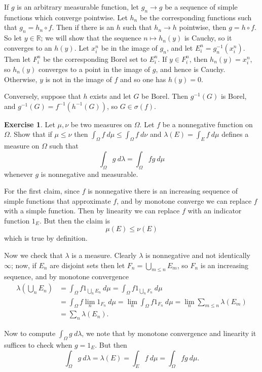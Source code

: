 \documentclass[10pt]{article}
\newcommand{\RR}{\mathbb{R}}
\theoremstyle{definition}
\newtheorem{exer}{Exercise}
\begin{document}
If $g$ is an arbitrary measurable function, let $g_n \to g$ be a sequence of simple functions which converge pointwise.
Let $h_n$ be the corresponding functions such that $g_n = h_n \circ f$. Then if there is an $h$ such that $h_n \to h$ pointwise, then $g = h \circ f$.
So let $y \in \RR$; we will show that the sequence $n \mapsto h_n(y)$ is Cauchy, so it converges to an $h(y)$.
Let $x_i^n$ be in the image of $g_n$, and let $E_i^n = g_n^{-1}(x_i^n)$.
Then let $F_i^n$ be the corresponding Borel set to $E_i^n$.
If $y \in F_i^n$, then $h_n(y) = x_i^n$, so $h_n(y)$ converges to a point in the image of $g$, and hence is Cauchy.
Otherwise, $y$ is not in the image of $f$ and so one has $h(y) = 0$.

Conversely, suppose that $h$ exists and let $G$ be Borel. Then $g^{-1}(G)$ is Borel, and $g^{-1}(G) = f^{-1}(h^{-1}(G))$, so $G \in \sigma(f)$.

\begin{exer}
Let $\mu, \nu$ be two measures on $\Omega$. Let $f$ be a nonnegative function on $\Omega$. Show that if $\mu \leq \nu$ then $\int_\Omega f ~d\mu \leq \int_\Omega f~d\nu$ and $\lambda(E) = \int_E f~d\mu$ defines a measure on $\Omega$ such that
$$\int_\Omega g~d\lambda = \int_\Omega fg~d\mu$$
whenever $g$ is nonnegative and measurable.
\end{exer}

For the first claim, since $f$ is nonnegative there is an increasing sequence of simple functions that approximate $f$, and by monotone converge we can replace $f$ with a simple function.
Then by linearity we can replace $f$ with an indicator function $1_E$. But then the claim is
$$\mu(E) \leq \nu(E)$$
which is true by definition.

Now we check that $\lambda$ is a measure. Clearly $\lambda$ is nonnegative and not identically $\infty$; now, if $E_n$ are disjoint sets then let $F_n = \bigcup_{m \leq n} E_m$, so $F_n$ is an increasing sequence, and by monotone convergence
\begin{align*}
\lambda\left(\bigcup_n E_n\right) &= \int_\Omega f1_{\bigcup_n E_n}~d\mu = \int_\Omega f1_{\bigcup_n F_n} ~d\mu \\
&= \int_\Omega f\lim_n 1_{F_n}~d\mu = \lim_n \int_\Omega f1_{F_n}~d\mu = \lim_n \sum_{m \leq n} \lambda(E_m) \\
&= \sum_n \lambda(E_n).
\end{align*}

Now to compute $\int_\Omega g~d\lambda$, we note that by monotone convergence and linearity it suffices to check when $g = 1_E$. But then
$$\int_\Omega g~d\lambda = \lambda(E) = \int_E f~d\mu = \int_\Omega fg~d\mu.$$
\end{document}
